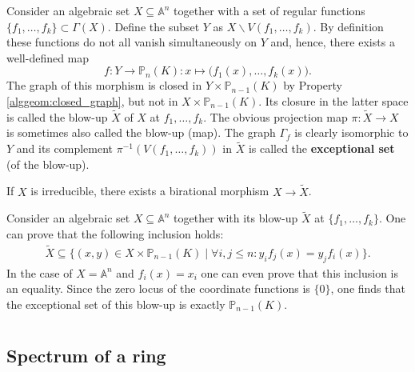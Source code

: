    \begin{construct}[Blow-up]
        Consider an algebraic set $X\subseteq\mathbb{A}^n$ together with a set of regular functions $\{f_1,\ldots,f_k\}\subset\Gamma(X)$. Define the subset $Y$ as $X\backslash V(f_1,\ldots,f_k)$. By definition these functions do not all vanish simultaneously on $Y$ and, hence, there exists a well-defined map \[f:Y\rightarrow \mathbb{P}_n(K):x\mapsto\Big(f_1(x),\ldots,f_k(x)\Big).\] The graph of this morphism is closed in $Y\times\mathbb{P}_{n-1}(K)$ by Property \ref{alggeom:closed_graph}, but not in $X\times\mathbb{P}_{n-1}(K)$. Its closure in the latter space is called the blow-up $\widetilde{X}$ of $X$ at $f_1,\ldots,f_k$. The obvious projection map $\pi:\widetilde{X}\rightarrow X$ is sometimes also called the blow-up (map). The graph $\Gamma_f$ is clearly isomorphic to $Y$ and its complement $\pi^{-1}(V(f_1,\ldots,f_k))$ in $\widetilde{X}$ is called the \textbf{exceptional set} (of the blow-up).

        If $X$ is irreducible, there exists a birational morphism $X\rightarrow\widetilde{X}$.
    \end{construct}
    \begin{property}
        Consider an algebraic set $X\subseteq\mathbb{A}^n$ together with its blow-up $\widetilde{X}$ at $\{f_1,\ldots,f_k\}$. One can prove that the following inclusion holds:
        \begin{gather}
            \widetilde{X}\subseteq\{(x,y)\in X\times\mathbb{P}_{n-1}(K)\mid\forall i,j\leq n:y_if_j(x)=y_jf_i(x)\}.
        \end{gather}
        In the case of $X=\mathbb{A}^n$ and $f_i(x)=x_i$ one can even prove that this inclusion is an equality. Since the zero locus of the coordinate functions is $\{0\}$, one finds that the exceptional set of this blow-up is exactly $\mathbb{P}_{n-1}(K)$.
    \end{property}

\section{}\label{section:schemes}
\subsection{Spectrum of a ring}


